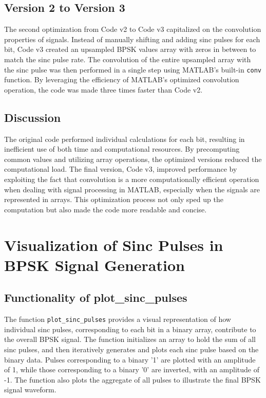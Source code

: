 \documentclass[11pt]{article}
\begin{document}
\subsection*{Version 2 to Version 3}
The second optimization from Code v2 to Code v3 capitalized on the convolution properties of signals. Instead of manually shifting and adding sinc pulses for each bit, Code v3 created an upsampled BPSK values array with zeros in between to match the sinc pulse rate. The convolution of the entire upsampled array with the sinc pulse was then performed in a single step using MATLAB's built-in \texttt{conv} function. By leveraging the efficiency of MATLAB's optimized convolution operation, the code was made three times faster than Code v2.

\subsection*{Discussion}
The original code performed individual calculations for each bit, resulting in inefficient use of both time and computational resources. By precomputing common values and utilizing array operations, the optimized versions reduced the computational load. The final version, Code v3, improved performance by exploiting the fact that convolution is a more computationally efficient operation when dealing with signal processing in MATLAB, especially when the signals are represented in arrays. This optimization process not only sped up the computation but also made the code more readable and concise.


\section*{Visualization of Sinc Pulses in BPSK Signal Generation}

\subsection*{Functionality of plot\_sinc\_pulses}
The function \texttt{plot\_sinc\_pulses} provides a visual representation of how individual sinc pulses, corresponding to each bit in a binary array, contribute to the overall BPSK signal. The function initializes an array to hold the sum of all sinc pulses, and then iteratively generates and plots each sinc pulse based on the binary data. Pulses corresponding to a binary '1' are plotted with an amplitude of 1, while those corresponding to a binary '0' are inverted, with an amplitude of -1. The function also plots the aggregate of all pulses to illustrate the final BPSK signal waveform.
\end{document}
